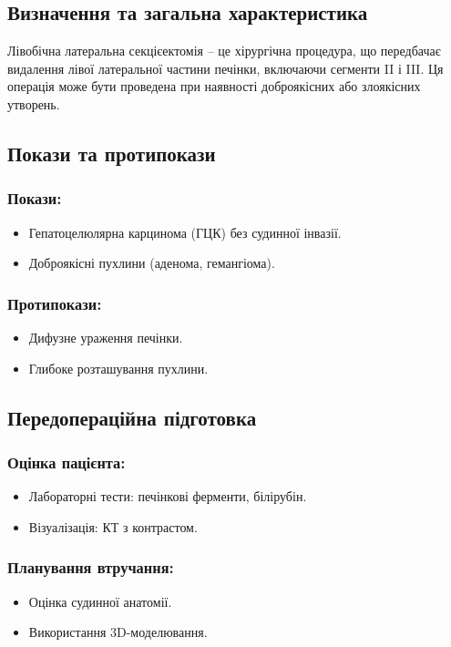\begin{refsection}
\subsection{Визначення та загальна характеристика}
Лівобічна латеральна секцієектомія – це хірургічна процедура, що передбачає видалення лівої латеральної частини печінки, включаючи сегменти II і III. Ця операція може бути проведена при наявності доброякісних або злоякісних утворень.

\subsection{Покази та протипокази}
\subsubsection{Покази:}
\begin{itemize}
    \item Гепатоцелюлярна карцинома (ГЦК) без судинної інвазії.
    \item Доброякісні пухлини (аденома, гемангіома).
\end{itemize}

\subsubsection{Протипокази:}
\begin{itemize}
    \item Дифузне ураження печінки.
    \item Глибоке розташування пухлини.
\end{itemize}

\subsection{Передопераційна підготовка}
\subsubsection{Оцінка пацієнта:}
\begin{itemize}
    \item Лабораторні тести: печінкові ферменти, білірубін.
    \item Візуалізація: КТ з контрастом.
\end{itemize}

\subsubsection{Планування втручання:}
\begin{itemize}
    \item Оцінка судинної анатомії.
    \item Використання 3D-моделювання.
\end{itemize}


\end{refsection}
